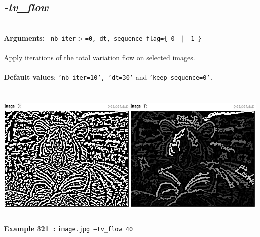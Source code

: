 \documentclass[a4paper,11pt,twoside]{book}
\begin{document}
\subsection{\emph{-tv\_flow} }\vspace*{-0.5em}
~\\\textbf{Arguments: } 
{\small \texttt{\_nb\_iter$>$=0,\_dt,\_sequence\_flag=\{ 0 ~$|$~ 1 \}}}\\~\\
Apply iterations of the total variation flow on selected images.
~\\~\\\textbf{Default values}: {\small \texttt{'nb\_iter=10', 'dt=30'} and \texttt{'keep\_sequence=0'.}}
\begin{center}\includegraphics[keepaspectratio=true,height=7cm,width=\textwidth]{img/gmic_def321.jpg}\\
{\footnotesize \textbf{Example 321~:} \texttt{image.jpg --tv\_flow 40}}
\end{center}
\end{document}
